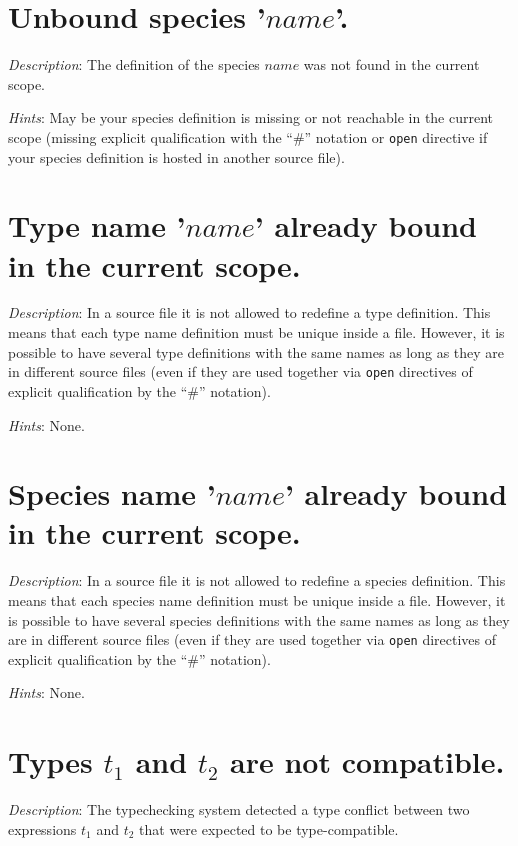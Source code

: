 \section*{Unbound species '$name$'.}
{\em Description}: The definition of the species $name$ was not found
in the current scope.

{\em Hints}: May be your species definition is missing or not
reachable in the current scope (missing explicit qualification with
the ``\#'' notation or {\tt open} directive if your species definition is
hosted in another source file).




\section*{Type name '$name$' already bound in the current scope.}
{\em Description}: In a source file it is not allowed to redefine a
type definition. This means that each type name definition must be
unique inside a file. However, it is possible to have several type
definitions with the same names as long as they are in different
source files (even if they are used together via {\tt open} directives
of explicit qualification by the ``\#'' notation).

{\em Hints}: None.



\section*{Species name '$name$' already bound in the current scope.}
{\em Description}: In a source file it is not allowed to redefine a
species definition. This means that each species name definition must
be unique inside a file. However, it is possible to have several species
definitions with the same names as long as they are in different
source files (even if they are used together via {\tt open} directives
of explicit qualification by the ``\#'' notation).

{\em Hints}: None.



\section*{Types $t_1$ and $t_2$ are not compatible.}
{\em Description}: The typechecking system detected a type conflict
between two expressions $t_1$ and $t_2$ that were expected to be
type-compatible.

